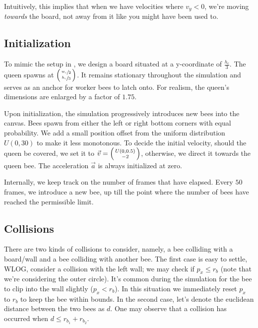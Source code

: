 \documentclass[a4paper,10pt]{article}
\begin{document}
\begin{multicols}{2}
    Intuitively, this implies that when we have velocities where $v_{y} < 0$, we're moving
    \textit{towards} the board, not away from it like you might have been used to.

    \subsection{Initialization}
    To mimic the setup in \cite{peleg2018collective}, we design a board situated at
    a y-coordinate of $\tfrac{h_{c}}{3}$. The queen spawns at 
    $\begin{psmallmatrix} \sfrac{w_{c}}{2} \\ \sfrac{h_{c}}{3} \end{psmallmatrix}$.
    It remains stationary throughout the simulation and serves as an anchor
    for worker bees to latch onto. For realism, the queen's dimensions are enlarged by
    a factor of $1.75$.

    Upon initialization, the simulation progressively introduces new bees into the
    canvas. Bees spawn from either the left or right bottom corners with equal
    probability. We add a small position offset from the uniform distribution $U(0, 30)$
    to make it less monotonous. To decide the initial velocity, should the queen be
    covered, we set it to $\vec{v} = \begin{psmallmatrix} U(0, 0.5) \\ -2 \end{psmallmatrix}$,
    otherwise, we direct it towards the queen bee. The acceleration $\vec{a}$ is always
    initialized at zero.

    Internally, we keep track on the number of frames that have elapsed. Every $50$
    frames, we introduce a new bee, up till the point where the number of bees
    have reached the permissible limit.

    \subsection{Collisions}
    There are two kinds of collisions to consider, namely, a bee colliding with a board/wall
    and a bee colliding with another bee. The first case is easy to settle, WLOG, consider
    a collision with the left wall; we may check if $p_{x} \leq r_{b}$ (note that we're
    considering the outer circle). It's common during the simulation for the bee to clip into
    the wall slightly ($p_{x} < r_{b}$). In this situation we immediately reset $p_{x}$ to $r_{b}$
    to keep the bee within bounds. In the second case, let's denote the euclidean distance
    between the two bees as $d$. One may observe that a collision has occurred when
    $d \leq r_{b_{1}}+r_{b_{2}}$.


\end{multicols}
\end{document}
